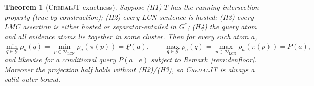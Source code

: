 \documentclass[11pt]{article}
\newtheorem{theorem}{Theorem}
\theoremstyle{definition}
\newcommand{\lo}{\underline}
\newcommand{\hi}{\overline}
\newcommand{\DLCN}{\mathcal{D}_{\mathrm{LCN}}}
\newcommand{\readoff}{\rho}
\begin{document}
\begin{theorem}[\textsc{CredalJT} exactness]\label{thm:d5}
Suppose \textup{(H1)} $T$ has the running-intersection property (true by
construction); \textup{(H2)} every LCN sentence is hosted; \textup{(H3)} every
LMC assertion is either hosted or separator-entailed in $G^\ast$; \textup{(H4)}
the query atom and all evidence atoms lie together in some cluster. Then for
every such atom $a$,
\[
  \min_{q\in\mathcal G}\readoff_a(q)=\min_{p\in\DLCN}\readoff_a(\pi(p))=\lo P(a),
  \qquad
  \max_{q\in\mathcal G}\readoff_a(q)=\max_{p\in\DLCN}\readoff_a(\pi(p))=\hi P(a),
\]
and likewise for a conditional query $P(a\mid e)$ subject to
Remark~\ref{rem:denfloor}. Moreover the \emph{projection} half holds without
\textup{(H2)}/\textup{(H3)}, so \textsc{CredalJT} is always a valid \emph{outer}
bound.
\end{theorem}
\end{document}
